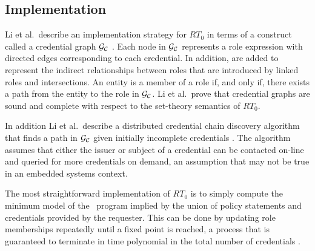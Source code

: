 \subsection{Implementation}

Li et al.~describe an implementation strategy for $RT_0$ in terms of a construct called a
credential graph $\mathcal{G}_{\mathcal{C}}$ \cite{Li:DCDTM}. Each node in $\mathcal{G}_{\mathcal{C}}$
represents a role expression with directed edges corresponding to each credential. In addition,
 are added to represent the indirect relationships between roles that are
introduced by linked roles and intersections. An entity is a member of a role if, and only if,
there exists a path from the entity to the role in $\mathcal{G}_{\mathcal{C}}$. Li et al.~prove that
credential graphs are sound and complete with respect to the set-theory semantics of $RT_0$.

In addition Li et al.~describe a distributed credential chain discovery algorithm that finds a
path in $\mathcal{G}_{\mathcal{C}}$ given initially incomplete credentials \cite{Li:DCDTM}. The
algorithm assumes that either the issuer or subject of a credential can be contacted on-line and
queried for more credentials on demand, an assumption that may not be true in an embedded
systems context.

The most straightforward implementation of $RT_0$ is to simply compute the minimum model of the
\datalog\ program implied by the union of policy statements and credentials provided by the
requester. This can be done by updating role memberships repeatedly until a fixed point is
reached, a process that is guaranteed to terminate in time polynomial in the total number of
credentials \cite{Li:DCFTML}.

